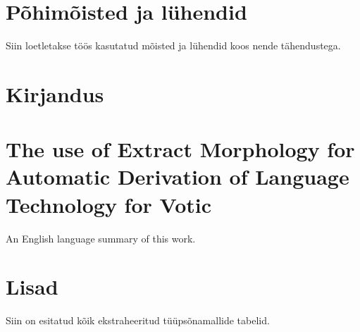 \documentclass[12pt,a4paper]{article}
\begin{document}
\newpage
\section{Põhimõisted ja lühendid}
\label{sec:põhimõisted}
Siin loetletakse töös kasutatud mõisted ja lühendid koos nende tähendustega.

\glsaddall
\small{
  \printglossary[title={},toctitle={}]
}








\newpage
\section{Kirjandus}
\label{sec:kirjandus}
{
  \renewcommand*{\bibfont}{\small}
  \printbibliography[heading=none]
}







\newpage
\section{The use of Extract Morphology for Automatic Derivation of Language Technology for Votic}

An English language summary of this work.







\newpage
\section{Lisad}

Siin on esitatud kõik ekstraheeritud tüüpsõnamallide tabelid.


\end{document}

